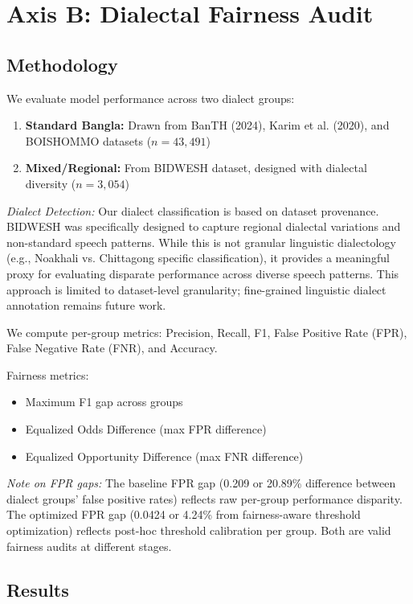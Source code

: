 \documentclass[conference]{IEEEtran}
\begin{document}
\section{Axis B: Dialectal Fairness Audit}

\subsection{Methodology}

We evaluate model performance across two dialect groups:
\begin{enumerate}
\item \textbf{Standard Bangla:} Drawn from BanTH (2024), Karim et al. (2020), and BOISHOMMO datasets ($n=43,491$)
\item \textbf{Mixed/Regional:} From BIDWESH dataset, designed with dialectal diversity ($n=3,054$)
\end{enumerate}

\textit{Dialect Detection:} Our dialect classification is based on dataset provenance. BIDWESH was specifically designed to capture regional dialectal variations and non-standard speech patterns. While this is not granular linguistic dialectology (e.g., Noakhali vs. Chittagong specific classification), it provides a meaningful proxy for evaluating disparate performance across diverse speech patterns. This approach is limited to dataset-level granularity; fine-grained linguistic dialect annotation remains future work.

We compute per-group metrics: Precision, Recall, F1, False Positive Rate (FPR), False Negative Rate (FNR), and Accuracy.

Fairness metrics:
\begin{itemize}
\item Maximum F1 gap across groups
\item Equalized Odds Difference (max FPR difference)~\cite{hardt2016equality}
\item Equalized Opportunity Difference (max FNR difference)
\end{itemize}

\textit{Note on FPR gaps:} The baseline FPR gap (0.209 or 20.89\% difference between dialect groups' false positive rates) reflects raw per-group performance disparity. The optimized FPR gap (0.0424 or 4.24\% from fairness-aware threshold optimization) reflects post-hoc threshold calibration per group. Both are valid fairness audits at different stages.

\subsection{Results}
\end{document}
